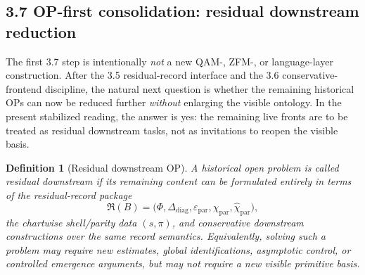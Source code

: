 \documentclass[12pt,a4paper]{article}
\newtheorem{definition}[theorem]{Definition}
\begin{document}
\subsection*{3.7 OP-first consolidation: residual downstream reduction}
The first 3.7 step is intentionally \emph{not} a new QAM-, ZFM-, or language-layer construction. After the 3.5 residual-record interface and the 3.6 conservative-frontend discipline, the natural next question is whether the remaining historical OPs can now be reduced further \emph{without} enlarging the visible ontology. In the present stabilized reading, the answer is yes: the remaining live fronts are to be treated as residual downstream tasks, not as invitations to reopen the visible basis.

\begin{definition}[Residual downstream OP]
\label{def:mainline-3700}
A historical open problem is called \emph{residual downstream} if its remaining content can be formulated entirely in terms of the residual-record package
\[
 \mathfrak R(B)=\bigl(\Phi,\Delta_{\mathrm{diag}},\varepsilon_{\mathrm{par}},\chi_{\mathrm{par}},\widehat\chi_{\mathrm{par}}\bigr),
\]
the chartwise shell/parity data \((s,\pi)\), and conservative downstream constructions over the same record semantics. Equivalently, solving such a problem may require new estimates, global identifications, asymptotic control, or controlled emergence arguments, but may not require a new visible primitive basis.
\end{definition}
\end{document}
